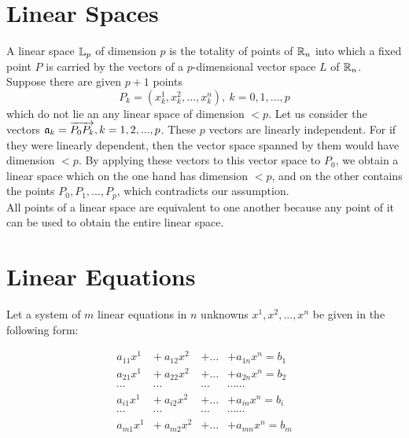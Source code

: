 \section{Linear Spaces}

A linear space $\mathbb{L}_p$ of dimension $p$ is the totality of points of $\mathbb{R}_n$ into which a fixed point $P$ is carried by the vectors of a $p$-dimensional vector space $L$ of $\mathbb{R}_n$. Suppose there are given $p+1$ points 
$$P_k = (x^1_k, x^2_k,...,x^n_k), ~k = 0, 1, ..., p$$ which do not lie an any linear space of dimension $<p$. Let us consider the vectors $\mathfrak{a}_k = \overrightarrow{P_0 P_k}, k = 1, 2, ...,p$. These $p$ vectors are linearly independent.
For if they were linearly dependent, then the vector space spanned by them would have dimension $<p$. By applying these vectors to this vector space to $P_0$, we obtain a linear space which on the one hand has dimension $<p$, and on
the other contains the points $P_0, P_1, ..., P_p$, which contradicts our assumption.\\

All points of a linear space are equivalent to one another because any point of it can be used to obtain the entire linear space. 

\section{Linear Equations}

Let a system of $m$ linear equations in $n$ unknowns $x^1, x^2, ..., x^n$ be given in the following form:


\begin{equation}
\begin{array}{cccc}
a_{11}x^1  &+ ~a_{12}x^2   & + \hdots  &+  a_{1n}x^n   = b_1 \\
a_{21}x^1  &+ ~ a_{22}x^2   &+ \hdots  &+  a_{2n}x^n   = b_2 \\
 \cdots       &\cdots            &\cdots      &\cdots                \cdots \\
a_{i1}x^1   &+  ~a_{i2}x^2    & + \hdots  &+  a_{in}x^n    = b_i \\
 \cdots       &\cdots            &\cdots      &\cdots                 \cdots\\
a_{m1}x^1 &+  ~a_{m2}x^2 & + \hdots  & +  a_{mn}x^n = b_m \\
\end{array}
\label{LinearSystem}
\end{equation}

